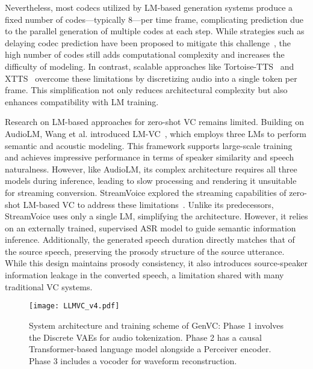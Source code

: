 Nevertheless, most codecs utilized by LM-based generation systems produce a fixed number of codes—typically 8—per time frame, complicating prediction due to the parallel generation of multiple codes at each step. While strategies such as delaying codec prediction have been proposed to mitigate this challenge~\cite{copet2023simple, defossez2024moshi}, the high number of codes still adds computational complexity and increases the difficulty of modeling. In contrast, scalable approaches like Tortoise-TTS~\cite{betker2023better} and XTTS~\cite{casanova2024xtts} overcome these limitations by discretizing audio into a single token per frame. This simplification not only reduces architectural complexity but also enhances compatibility with LM training.

Research on LM-based approaches for zero-shot VC remains limited. Building on AudioLM, Wang et al. introduced LM-VC~\cite{wang2023lm}, which employs three LMs to perform semantic and acoustic modeling. This framework supports large-scale training and achieves impressive performance in terms of speaker similarity and speech naturalness. However, like AudioLM, its complex architecture requires all three models during inference, leading to slow processing and rendering it unsuitable for streaming conversion. StreamVoice explored the streaming capabilities of zero-shot LM-based VC to address these limitations~\cite{wang2024streamvoice}. Unlike its predecessors, StreamVoice uses only a single LM, simplifying the architecture. However, it relies on an externally trained, supervised ASR model to guide semantic information inference. Additionally, the generated speech duration directly matches that of the source speech, preserving the prosody structure of the source utterance. While this design maintains prosody consistency, it also introduces source-speaker information leakage in the converted speech, a limitation shared with many traditional VC systems.

\label{sec:model}
\begin{figure*}[ht]
\vskip 0.2in
  \begin{center}
  \texttt{[image: LLMVC\_v4.pdf]}
  \caption{System architecture and training scheme of GenVC:
Phase 1 involves the Discrete VAEs for audio tokenization. Phase 2 has a causal Transformer-based language model alongside a Perceiver encoder. Phase 3 includes a vocoder for waveform reconstruction.}
  \label{fig:genvc}
  \end{center}
  \vskip -0.2in
\end{figure*}